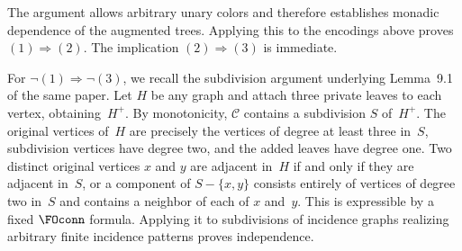 \documentclass[1p,number,11pt]{elsarticle}
\theoremstyle{plain}
\newcommand{\Cc}{\mathscr{C}}
\begin{document}
The argument allows arbitrary unary colors and therefore establishes monadic dependence of the augmented trees. 
Applying this to the encodings above proves $(1)\Rightarrow(2)$. 
The implication $(2)\Rightarrow(3)$ is immediate.

For $\neg(1)\Rightarrow\neg(3)$, we recall the subdivision argument underlying Lemma~9.1 of the same paper. 
Let $H$ be any graph and attach three private leaves to each vertex, obtaining~$H^+$. By monotonicity, $\Cc$ contains a subdivision $S$ of~$H^+$. The original vertices of~$H$ are precisely the vertices of degree at least three in~$S$, subdivision vertices have degree two, and the added leaves have degree one. 
Two distinct original vertices $x$ and $y$ are adjacent in~$H$ if and only if they are adjacent in~$S$, or a component of $S-\{x,y\}$ consists entirely of vertices of degree two in~$S$ and contains a neighbor of each of $x$ and~$y$. 
This is expressible by a fixed $\FOconn$ formula. 
Applying it to subdivisions of incidence graphs realizing arbitrary finite incidence patterns proves independence.




\end{document}
